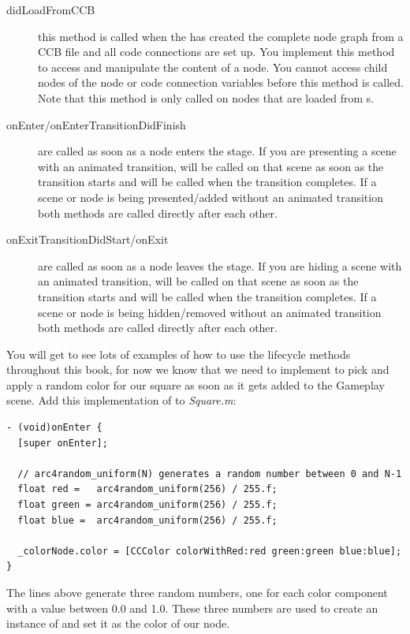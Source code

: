 \begin{description}
  \item[didLoadFromCCB] this method is called when the 
  has created the complete node graph from a CCB file and all code connections
  are set up. You implement this method to access and manipulate the content of
  a node. You cannot access child nodes of the node or code connection
  variables before this method is called. Note that this method is only called
  on nodes that are loaded from \ccbfile{}s.
  \item[onEnter/onEnterTransitionDidFinish] are called as soon as a node enters
  the stage. If you are presenting a scene with an animated transition,
   will be called on that scene as soon as the transition
  starts and  will be called when the transition
  completes. If a scene or node is being presented/added without an animated
  transition both methods are called directly after each other.
  \item[onExitTransitionDidStart/onExit] are called as soon as a node leaves the
  stage. If you are hiding a scene with an animated transition,
   will be called on that scene as soon as
  the transition starts and  will be called when the
  transition completes. If a scene or node is being hidden/removed without an
  animated transition both methods are called directly after each other.
\end{description}

You will get to see lots of examples of how to use the lifecycle methods
throughout this book, for now we know that we need to implement
 to pick and apply a random color for our square as soon as
it gets added to the Gameplay scene.
Add this implementation of  to \textit{Square.m}:
\begin{lstlisting}
- (void)onEnter {
  [super onEnter];
  
  // arc4random_uniform(N) generates a random number between 0 and N-1
  float red =   arc4random_uniform(256) / 255.f;
  float green = arc4random_uniform(256) / 255.f;
  float blue =  arc4random_uniform(256) / 255.f;
  
  _colorNode.color = [CCColor colorWithRed:red green:green blue:blue];
}
\end{lstlisting}
The lines above generate three random numbers, one for each color component
with a value between 0.0 and 1.0. These three numbers are used to create an
instance of  and set it as the color of our node. 

